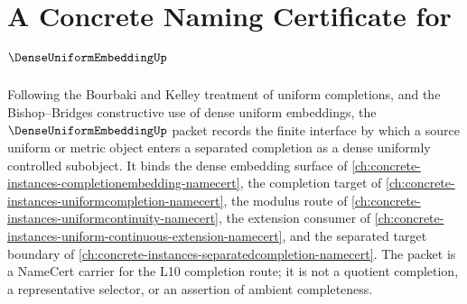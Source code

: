 \chapter{A Concrete Naming Certificate for $\DenseUniformEmbeddingUp$}
\label{ch:concrete-instances-dense-uniform-embedding-namecert}

Following the Bourbaki and Kelley treatment of uniform completions, and the Bishop--Bridges constructive use of dense uniform embeddings, the $\DenseUniformEmbeddingUp$ packet records the finite interface by which a source uniform or metric object enters a separated completion as a dense uniformly controlled subobject. It binds the dense embedding surface of \autoref{ch:concrete-instances-completionembedding-namecert}, the completion target of \autoref{ch:concrete-instances-uniformcompletion-namecert}, the modulus route of \autoref{ch:concrete-instances-uniformcontinuity-namecert}, the extension consumer of \autoref{ch:concrete-instances-uniform-continuous-extension-namecert}, and the separated target boundary of \autoref{ch:concrete-instances-separatedcompletion-namecert}. The packet is a NameCert carrier for the L10 completion route; it is not a quotient completion, a representative selector, or an assertion of ambient completeness.

